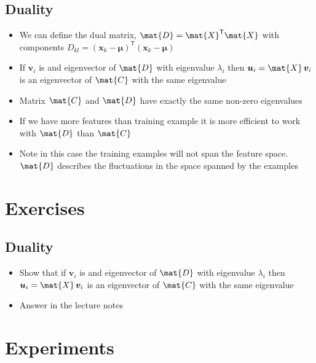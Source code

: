 \documentclass[11pt]{article}
\newcommand{\tr}{\textsf{T}}
\begin{document}
\subsection{Duality}
\label{sec:orga1b8d50}
\begin{itemize}
\item We can define the dual matrix, \(\mat{D}= \mat{X}^\tr\mat{X}\) with
components \(D_{kl} = (\bm{x}_k-\bm{\mu})^\tr(\bm{x}_k-\bm{\mu})\)
\item If \(\bm{v}_i\) is and eigenvector of \(\mat{D}\) with eigenvalue
\(\lambda_i\) then \(\bm{u}_i = \mat{X} \, \bm{v}_i\) is an
eigenvector of \(\mat{C}\) with the same eigenvalue
\item Matrix \(\mat{C}\) and \(\mat{D}\) have exactly the same non-zero
eigenvalues
\item If we have more features than training example it is more
efficient to work with \(\mat{D}\) than \(\mat{C}\)
\item Note in this case the training examples will not span the feature
space.  \(\mat{D}\) describes the fluctuations in the space spanned
by the examples
\end{itemize}

\section{Exercises}
\label{sec:orgb1019ec}

\subsection{Duality}
\label{sec:org92f5223}
\begin{itemize}
\item Show that if \(\bm{v}_i\) is and eigenvector of \(\mat{D}\) with eigenvalue
\(\lambda_i\) then \(\bm{u}_i = \mat{X} \, \bm{v}_i\) is an
eigenvector of \(\mat{C}\) with the same eigenvalue
\item Answer in the lecture notes
\end{itemize}

\section{Experiments}
\label{sec:orgb01c513}
\end{document}
